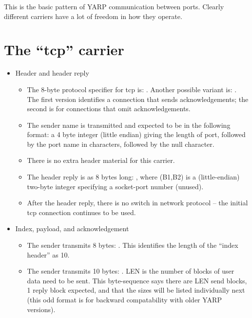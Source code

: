 \noindent
This is the basic pattern of YARP communication between ports.
Clearly different carriers have a lot of freedom in how they operate.


\section{The ``tcp'' carrier}


\begin{itemize}

\item{Header and header reply}

  \begin{itemize}
    
  \item The 8-byte protocol specifier for tcp is: .  Another possible variant is: .  The first version identifies a connection
    that sends acknowledgements; the second is for connections that
    omit acknowledgements.
    
  \item The sender name is transmitted and expected to be in the
    following format: a 4 byte integer (little endian) giving the length
    of port, followed by the port name in characters, followed by the null
    character.

  \item There is no extra header material for this carrier.

  \item The header reply is as 8 bytes long: , where (B1,B2) is a (little-endian) two-byte integer
    specifying a socket-port number (unused).  

  \item After the header reply, there is no switch in network protocol
    -- the initial tcp connection continues to be used.

    \end{itemize}

\item{Index, payload, and acknowledgement}

  \begin{itemize}

  \item The sender transmits 8 bytes: .
    This identifies the length of the ``index header'' as 10.
    
  \item The sender transmits 10 bytes: .  LEN is the number of blocks of user data need
    to be sent.  This byte-sequence says there are LEN send blocks, 1
    reply block expected, and that the sizes will be listed
    individually next (this odd format is for backward compatability
    with older YARP versions).
      

\end{itemize}
\end{itemize}
